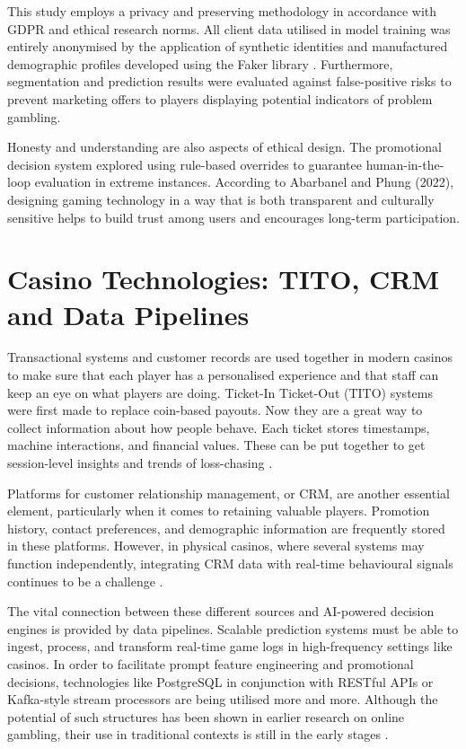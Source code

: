 \documentclass[12pt,a4paper]{report}
\begin{document}
This study employs a privacy and preserving methodology in accordance with GDPR and ethical research norms. All client data utilised in model training was entirely anonymised by the application of synthetic identities and manufactured demographic profiles developed using the Faker library \citep{faker2025}. Furthermore, segmentation and prediction results were evaluated against false-positive risks to prevent marketing offers to players displaying potential indicators of problem gambling.

Honesty and understanding are also aspects of ethical design.  The promotional decision system explored using rule-based overrides to guarantee human-in-the-loop evaluation in extreme instances.  According to Abarbanel and Phung (2022), designing gaming technology in a way that is both transparent and culturally sensitive helps to build trust among users and encourages long-term participation.

\section{Casino Technologies: TITO, CRM and Data Pipelines}

Transactional systems and customer records are used together in modern casinos to make sure that each player has a personalised experience and that staff can keep an eye on what players are doing.  Ticket-In Ticket-Out (TITO) systems were first made to replace coin-based payouts. Now they are a great way to collect information about how people behave.  Each ticket stores timestamps, machine interactions, and financial values. These can be put together to get session-level insights and trends of loss-chasing \citep{Nemis2024}.

Platforms for customer relationship management, or CRM, are another essential element, particularly when it comes to retaining valuable players.  Promotion history, contact preferences, and demographic information are frequently stored in these platforms.  However, in physical casinos, where several systems may function independently, integrating CRM data with real-time behavioural signals continues to be a challenge \citep{Wayne2024}.

The vital connection between these different sources and AI-powered decision engines is provided by data pipelines.  Scalable prediction systems must be able to ingest, process, and transform real-time game logs in high-frequency settings like casinos.  In order to facilitate prompt feature engineering and promotional decisions, technologies like PostgreSQL in conjunction with RESTful APIs or Kafka-style stream processors are being utilised more and more.  Although the potential of such structures has been shown in earlier research on online gambling, their use in traditional contexts is still in the early stages \citep{Omike2022a}.
\end{document}
